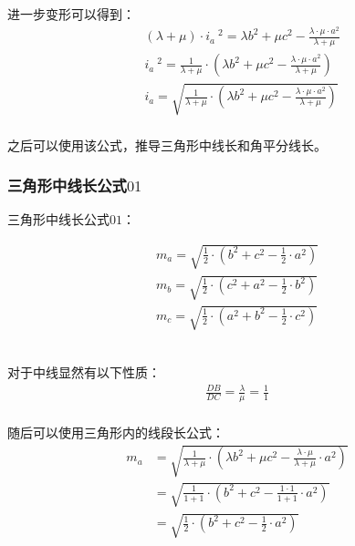 \documentclass[UTF8]{ctexart}
\begin{document}
\newpage

    进一步变形可以得到：
    \begin{align}
        &(\lambda+\mu)\cdot i_a~^2=\lambda b^2+\mu c^2-\frac{\lambda\cdot\mu\cdot a^2}{\lambda+\mu}\\[4mm]
        &i_a~^2=\frac{1}{\lambda+\mu}\cdot\left(\lambda b^2+\mu c^2-\frac{\lambda\cdot\mu\cdot a^2}{\lambda+\mu}\right)\\[4mm]
        &i_a=\sqrt{\frac{1}{\lambda+\mu}\cdot\left(\lambda b^2+\mu c^2-\frac{\lambda\cdot\mu\cdot a^2}{\lambda+\mu}\right)}
    \end{align}\\
    之后可以使用该公式，推导三角形中线长和角平分线长。

\newpage

\subsubsection{三角形中线长公式$01$}
    三角形中线长公式$01$：
    \begin{large}
        \begin{align*}
            m_a=\sqrt{\frac{1}{2}\cdot\left(b^2+c^2-\frac{1}{2}\cdot a^2\right)}\\[4mm]
            m_b=\sqrt{\frac{1}{2}\cdot\left(c^2+a^2-\frac{1}{2}\cdot b^2\right)}\\[4mm]
            m_c=\sqrt{\frac{1}{2}\cdot\left(a^2+b^2-\frac{1}{2}\cdot c^2\right)}
        \end{align*}
    \end{large}\\
    对于中线显然有以下性质：
    \setcounter{equation}{0}
    \begin{align}
        \frac{DB}{DC}=\frac{\lambda}{\mu}=\frac{1}{1}
    \end{align}\\
    随后可以使用三角形内的线段长公式：\vspace{5pt}
    \begin{align}
        m_a
        &=\sqrt{\frac{1}{\lambda+\mu}\cdot\left(\lambda b^2+\mu c^2-\frac{\lambda\cdot \mu}{\lambda +\mu}\cdot a^2\right)}\\[4mm]
        &=\sqrt{\frac{1}{1+1}\cdot\left(b^2+c^2-\frac{1\cdot 1}{1+1}\cdot a^2\right)}\\[4mm]
        &=\sqrt{\frac{1}{2}\cdot\left(b^2+c^2-\frac{1}{2}\cdot a^2\right)}
    \end{align}

\newpage
\end{document}
